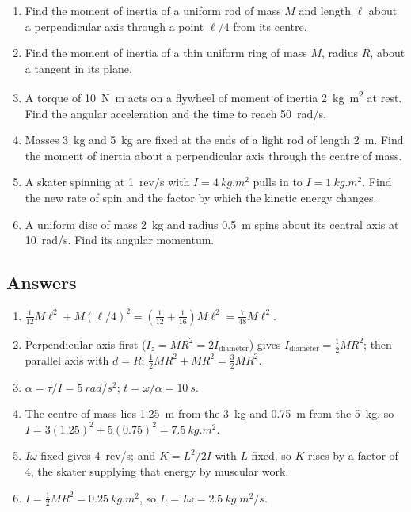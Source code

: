 \begin{enumerate}[itemsep=3pt]
\item Find the moment of inertia of a uniform rod of mass $M$ and length $\ell$ about a perpendicular
      axis through a point $\ell/4$ from its centre.
\item Find the moment of inertia of a thin uniform ring of mass $M$, radius $R$, about a tangent in its
      plane.
\item A torque of \SI{10}{N.m} acts on a flywheel of moment of inertia \SI{2}{kg.m^2} at rest. Find
      the angular acceleration and the time to reach \SI{50}{rad/s}.
\item Masses \SI{3}{kg} and \SI{5}{kg} are fixed at the ends of a light rod of length \SI{2}{m}. Find
      the moment of inertia about a perpendicular axis through the centre of mass.
\item A skater spinning at \SI{1}{rev/s} with $I=\SI{4}{kg.m^2}$ pulls in to $I=\SI{1}{kg.m^2}$. Find
      the new rate of spin and the factor by which the kinetic energy changes.
\item A uniform disc of mass \SI{2}{kg} and radius \SI{0.5}{m} spins about its central axis at
      \SI{10}{rad/s}. Find its angular momentum.
\end{enumerate}

\subsection*{Answers}
{\small
\begin{enumerate}[itemsep=2pt]
\item $\tfrac{1}{12}M\ell^{2}+M(\ell/4)^{2}
=\left(\tfrac{1}{12}+\tfrac{1}{16}\right)M\ell^{2}=\tfrac{7}{48}M\ell^{2}$.
\item Perpendicular axis first ($I_z=MR^{2}=2I_{\text{diameter}}$) gives $I_{\text{diameter}}=\tfrac{1}{2}MR^{2}$;
then parallel axis with $d=R$: $\tfrac{1}{2}MR^{2}+MR^{2}=\tfrac{3}{2}MR^{2}$.
\item $\alpha=\tau/I=\SI{5}{rad/s^2}$; $t=\omega/\alpha=\SI{10}{s}$.
\item The centre of mass lies \SI{1.25}{m} from the \SI{3}{kg} and \SI{0.75}{m} from the
\SI{5}{kg}, so $I=3(1.25)^{2}+5(0.75)^{2}=\SI{7.5}{kg.m^2}$.
\item $I\omega$ fixed gives \SI{4}{rev/s}; and $K=L^{2}/2I$ with $L$ fixed, so $K$ rises by a
factor of $4$, the skater supplying that energy by muscular work.
\item $I=\tfrac{1}{2}MR^{2}=\SI{0.25}{kg.m^2}$, so $L=I\omega=\SI{2.5}{kg.m^2/s}$.
\end{enumerate}
}
